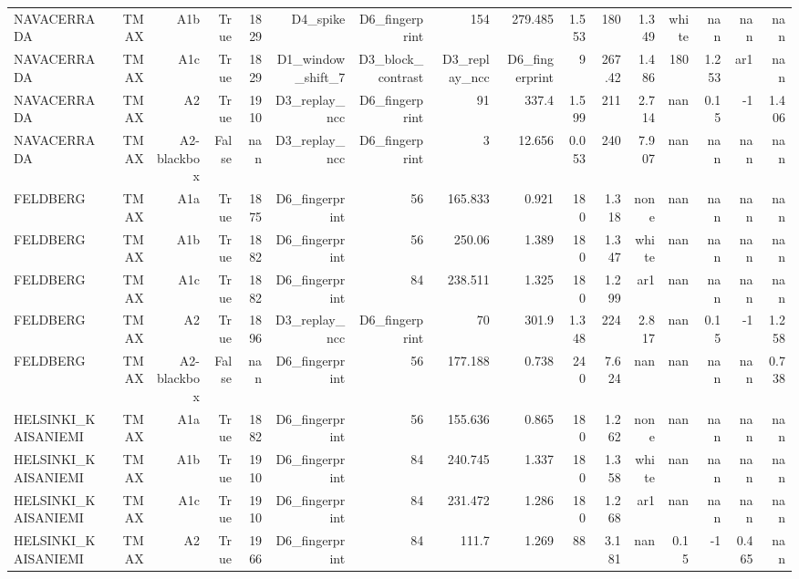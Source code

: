 \documentclass[10pt,a4paper]{article}
\begin{document}
\begin{center}
{\begin{tabular}{lrrrrrrrrrrrrrrr}
NAVACERRADA & TMAX & A1b & True & 1829 & D4\_\allowbreak{}spike & D6\_\allowbreak{}fingerprint & 154 & 279.485 & 1.553 & 180 & 1.349 & white & nan & nan & nan \\
NAVACERRADA & TMAX & A1c & True & 1829 & D1\_\allowbreak{}window\_\allowbreak{}shift\_\allowbreak{}7 & D3\_\allowbreak{}block\_\allowbreak{}contrast & D3\_\allowbreak{}replay\_\allowbreak{}ncc & D6\_\allowbreak{}fingerprint & 9 & 267.42 & 1.486 & 180 & 1.253 & ar1 & nan \\
NAVACERRADA & TMAX & A2 & True & 1910 & D3\_\allowbreak{}replay\_\allowbreak{}ncc & D6\_\allowbreak{}fingerprint & 91 & 337.4 & 1.599 & 211 & 2.714 & nan & 0.15 & -\allowbreak{}1 & 1.406 \\
NAVACERRADA & TMAX & A2-\allowbreak{}blackbox & False & nan & D3\_\allowbreak{}replay\_\allowbreak{}ncc & D6\_\allowbreak{}fingerprint & 3 & 12.656 & 0.053 & 240 & 7.907 & nan & nan & nan & nan \\
FELDBERG & TMAX & A1a & True & 1875 & D6\_\allowbreak{}fingerprint & 56 & 165.833 & 0.921 & 180 & 1.318 & none & nan & nan & nan & nan \\
FELDBERG & TMAX & A1b & True & 1882 & D6\_\allowbreak{}fingerprint & 56 & 250.06 & 1.389 & 180 & 1.347 & white & nan & nan & nan & nan \\
FELDBERG & TMAX & A1c & True & 1882 & D6\_\allowbreak{}fingerprint & 84 & 238.511 & 1.325 & 180 & 1.299 & ar1 & nan & nan & nan & nan \\
FELDBERG & TMAX & A2 & True & 1896 & D3\_\allowbreak{}replay\_\allowbreak{}ncc & D6\_\allowbreak{}fingerprint & 70 & 301.9 & 1.348 & 224 & 2.817 & nan & 0.15 & -\allowbreak{}1 & 1.258 \\
FELDBERG & TMAX & A2-\allowbreak{}blackbox & False & nan & D6\_\allowbreak{}fingerprint & 56 & 177.188 & 0.738 & 240 & 7.624 & nan & nan & nan & nan & 0.738 \\
HELSINKI\_\allowbreak{}KAISANIEMI & TMAX & A1a & True & 1882 & D6\_\allowbreak{}fingerprint & 56 & 155.636 & 0.865 & 180 & 1.262 & none & nan & nan & nan & nan \\
HELSINKI\_\allowbreak{}KAISANIEMI & TMAX & A1b & True & 1910 & D6\_\allowbreak{}fingerprint & 84 & 240.745 & 1.337 & 180 & 1.358 & white & nan & nan & nan & nan \\
HELSINKI\_\allowbreak{}KAISANIEMI & TMAX & A1c & True & 1910 & D6\_\allowbreak{}fingerprint & 84 & 231.472 & 1.286 & 180 & 1.268 & ar1 & nan & nan & nan & nan \\
HELSINKI\_\allowbreak{}KAISANIEMI & TMAX & A2 & True & 1966 & D6\_\allowbreak{}fingerprint & 84 & 111.7 & 1.269 & 88 & 3.181 & nan & 0.15 & -\allowbreak{}1 & 0.465 & nan \\

\end{tabular}}
\end{center}
\end{document}
